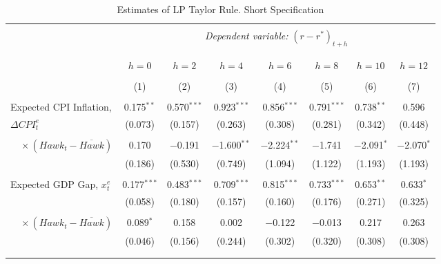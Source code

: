 \documentclass[11pt]{article}
\begin{document}
\begin{table}[!hbtp]\centering \footnotesize
  \begin{threeparttable} \centering
    \caption{Estimates of LP Taylor Rule. Short Specification}
    \label{tab:LP_short}
    \begin{tabular}{@{\extracolsep{5pt}}lccccccc} 
      \\[-1.8ex]\hline 
      \hline \\[-1.8ex] 
       & \multicolumn{7}{c}{\textit{Dependent variable:} $\left(r-r^*\right)_{t+h}$} \\  
       \\[-1.8ex]
      \cline{2-8} 
      \\[-1.8ex] & $h=0$ & $h=2$ & $h=4$ & $h=6$ & $h=8$ & $h=10$ & $h=12$ \\ 
      \\[-1.8ex] & (1) & (2) & (3) & (4) & (5) & (6) & (7)\\ 
      \hline \\[-1.8ex] 
       Expected CPI Inflation, & 0.175$^{**}$ & 0.570$^{***}$ & 0.923$^{***}$ & 0.856$^{***}$ & 0.791$^{***}$ & 0.738$^{**}$ & 0.596 \\ 
        $\Delta\mathit{CPI}_t^e$ & (0.073) & (0.157) & (0.263) & (0.308) & (0.281) & (0.342) & (0.448) \\ 
       & & & & & & & \\ 
       $\quad \times \left(\mathit{Hawk}_t-\overline{\mathit{Hawk}}\right)$ & 0.170 & $-$0.191 & $-$1.600$^{**}$ & $-$2.224$^{**}$ & $-$1.741 & $-$2.091$^{*}$ & $-$2.070$^{*}$ \\ 
       & (0.186) & (0.530) & (0.749) & (1.094) & (1.122) & (1.193) & (1.193) \\ 
       & & & & & & & \\ 
       Expected GDP Gap, $x_t^e$ & 0.177$^{***}$ & 0.483$^{***}$ & 0.709$^{***}$ & 0.815$^{***}$ & 0.733$^{***}$ & 0.653$^{**}$ & 0.633$^{*}$ \\ 
       & (0.058) & (0.180) & (0.157) & (0.160) & (0.176) & (0.271) & (0.325) \\ 
       & & & & & & & \\ 
       $\quad \times \left(\mathit{Hawk}_t-\overline{\mathit{Hawk}}\right)$ & 0.089$^{*}$ & 0.158 & 0.002 & $-$0.122 & $-$0.013 & 0.217 & 0.263 \\ 
       & (0.046) & (0.156) & (0.244) & (0.302) & (0.320) & (0.308) & (0.308) \\ 
       & & & & & & & \\ 
       \hline \\[-1.8ex] 

\end{tabular}
\end{threeparttable}
\end{table}
\end{document}
